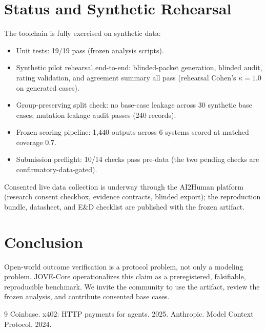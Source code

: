\documentclass[11pt]{article}
\begin{document}
\section{Status and Synthetic Rehearsal}
The toolchain is fully exercised on synthetic data:
\begin{itemize}
  \item Unit tests: 19/19 pass (frozen analysis scripts).
  \item Synthetic pilot rehearsal end-to-end: blinded-packet generation, blinded audit, rating validation, and agreement summary all pass (rehearsal Cohen's $\kappa=1.0$ on generated cases).
  \item Group-preserving split check: no base-case leakage across 30 synthetic base cases; mutation leakage audit passes (240 records).
  \item Frozen scoring pipeline: 1{,}440 outputs across 6 systems scored at matched coverage 0.7.
  \item Submission preflight: 10/14 checks pass pre-data (the two pending checks are confirmatory-data-gated).
\end{itemize}
Consented live data collection is underway through the AI2Human platform (research consent checkbox, evidence contracts, blinded export); the reproduction bundle, datasheet, and E\&D checklist are published with the frozen artifact.

\section{Conclusion}
Open-world outcome verification is a protocol problem, not only a modeling problem. JOVE-Core operationalizes this claim as a preregistered, falsifiable, reproducible benchmark. We invite the community to use the artifact, review the frozen analysis, and contribute consented base cases.

{\small

\begin{thebibliography}{9}
 Coinbase. x402: HTTP payments for agents. 2025.
 Anthropic. Model Context Protocol. 2024.
\end{thebibliography}
}
\end{document}
